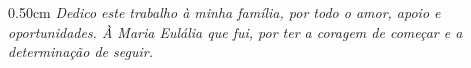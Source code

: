 \begin{dedicatoria}
  \vspace*{\fill}
  \begin{adjustwidth}{0.5\textwidth}{0cm}
    \raggedleft\itshape
    Dedico este trabalho à minha família, por todo o amor, apoio e oportunidades. À Maria Eulália que fui, por ter a coragem de começar e a determinação de seguir.
  \end{adjustwidth}
\end{dedicatoria}
